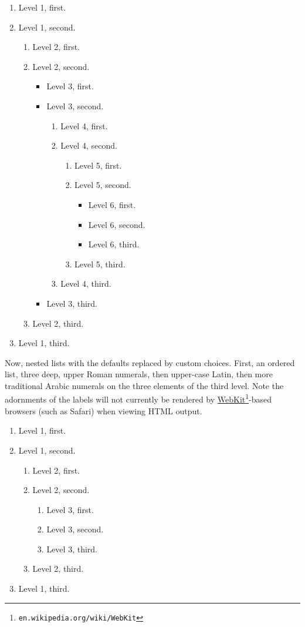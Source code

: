\documentclass{amsart}
\theoremstyle{plain}%
\theoremstyle{definition}%
\theoremstyle{remark}%
\numberwithin{equation}{section}
\begin{document}
\begin{enumerate}
\item{}Level 1, first.%
\item{}Level 1, second.%
\begin{enumerate}
\item{}Level 2, first.%
\item{}Level 2, second.%
\begin{itemize}[label=\textbullet]
\item{}Level 3, first.%
\item{}Level 3, second.%
\begin{enumerate}
\item{}Level 4, first.%
\item{}Level 4, second.%
\begin{enumerate}
\item{}Level 5, first.%
\item{}Level 5, second.%
\begin{itemize}[label=$\circ$]
\item{}Level 6, first.%
\item{}Level 6, second.%
\item{}Level 6, third.%
\end{itemize}
%
\item{}Level 5, third.%
\end{enumerate}
%
\item{}Level 4, third.%
\end{enumerate}
%
\item{}Level 3, third.%
\end{itemize}
%
\item{}Level 2, third.%
\end{enumerate}
%
\item{}Level 1, third.%
\end{enumerate}
%
\par
Now, nested lists with the defaults replaced by custom choices.  First, an ordered list, three deep, upper Roman numerals, then upper-case Latin, then more traditional Arabic numerals on the three elements of the third level.  Note the adornments of the labels will not currently be rendered by \href{https://en.wikipedia.org/wiki/WebKit}{WebKit}\footnote{\nolinkurl{en.wikipedia.org/wiki/WebKit}\label{section-lists-2-13-2}}-based browsers (such as Safari) when viewing HTML output.%
\begin{enumerate}[label={*\Roman**}]
\item{}Level 1, first.%
\item{}Level 1, second.%
\begin{enumerate}[label={++\Alph*}]
\item{}Level 2, first.%
\item{}Level 2, second.%
\begin{enumerate}[label={\arabic*)}]
\item{}Level 3, first.%
\item{}Level 3, second.%
\item{}Level 3, third.%
\end{enumerate}
%
\item{}Level 2, third.%
\end{enumerate}
%
\item{}Level 1, third.%
\end{enumerate}
\end{document}
